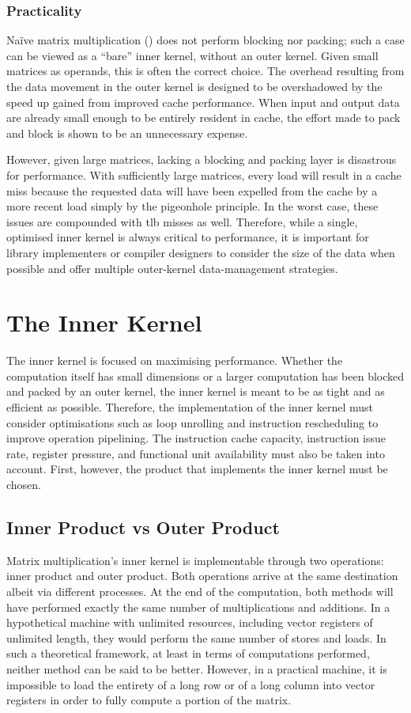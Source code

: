 \documentclass[\main/thesis.tex]{subfiles}
\begin{document}
\subsubsection{Practicality}
Na\"ive matrix multiplication (\ie {}) does not perform blocking nor packing; such a case can be viewed as a ``bare'' inner kernel, without an outer kernel.
Given small matrices as operands, this is often the correct choice.
The overhead resulting from the data movement in the outer kernel is designed to be overshadowed by the speed up gained from improved cache performance.
When input and output data are already small enough to be entirely resident in cache, the effort made to pack and block is shown to be an unnecessary expense.

However, given large matrices, lacking a blocking and packing layer is disastrous for performance.
With sufficiently large matrices, every load will result in a cache miss because the requested data will have been expelled from the cache by a more recent load simply by the pigeonhole principle.
In the worst case, these issues are compounded with \gls{tlb} misses as well.
Therefore, while a single, optimised inner kernel is always critical to performance, it is important for library implementers or compiler designers to consider the size of the data when possible and offer multiple outer-kernel data-management strategies.

\section{The Inner Kernel}
\label{sec:innerKernel}
The inner kernel is focused on maximising performance.
Whether the computation itself has small dimensions or a larger computation has been blocked and packed by an outer kernel, the inner kernel is meant to be as tight and as efficient as possible.
Therefore, the implementation of the inner kernel must consider optimisations such as loop unrolling and instruction rescheduling to improve operation pipelining.
The instruction cache capacity, instruction issue rate, register pressure, and functional unit availability must also be taken into account.
First, however, the product that implements the inner kernel must be chosen.

\subsection{Inner Product vs Outer Product}
\label{sec:productsVs}
Matrix multiplication's inner kernel is implementable through two operations: inner product and outer product.
Both operations arrive at the same destination albeit via different processes.
At the end of the computation, both methods will have performed exactly the same number of multiplications and additions.
In a hypothetical machine with unlimited resources, including vector registers of unlimited length, they would perform the same number of stores and loads.
In such a theoretical framework, at least in terms of computations performed, neither method can be said to be better.
However, in a practical machine, it is impossible to load the entirety of a long row or of a long column into vector registers in order to fully compute a portion of the matrix.
\end{document}
